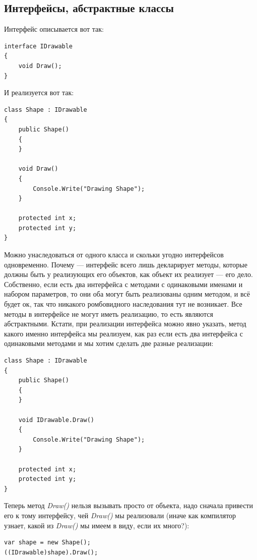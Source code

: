 \documentclass[a5paper]{article}
\begin{document}
\subsection{Интерфейсы, абстрактные классы}

Интерфейс описывается вот так:

\begin{verbatim}
interface IDrawable
{
    void Draw();
}
\end{verbatim}

И реализуется вот так:

\begin{verbatim}
class Shape : IDrawable
{
    public Shape() 
    { 
    }

    void Draw()
    {
        Console.Write("Drawing Shape");
    }

    protected int x;
    protected int y;
}
\end{verbatim}

Можно унаследоваться от одного класса и скольки угодно интерфейсов одновременно. Почему --- интерфейс всего лишь декларирует методы, которые должны быть у реализующих его объектов, как объект их реализует --- его дело. Собственно, если есть два интерфейса с методами с одинаковыми именами и набором параметров, то они оба могут быть реализованы одним методом, и всё будет ок, так что никакого ромбовидного наследования тут не возникает. Все методы в интерфейсе не могут иметь реализацию, то есть являются абстрактными. Кстати, при реализации интерфейса можно явно указать, метод какого именно интерфейса мы реализуем, как раз если есть два интерфейса с одинаковыми методами и мы хотим сделать две разные реализации:

\begin{verbatim}
class Shape : IDrawable
{
    public Shape() 
    { 
    }

    void IDrawable.Draw()
    {
        Console.Write("Drawing Shape");
    }

    protected int x;
    protected int y;
}
\end{verbatim}

Теперь метод \textit{Draw()} нельзя вызывать просто от объекта, надо сначала привести его к тому интерфейсу, чей \textit{Draw()} мы реализовали (иначе как компилятор узнает, какой из \textit{Draw()} мы имеем в виду, если их много?):

\begin{verbatim}
var shape = new Shape();
((IDrawable)shape).Draw();
\end{verbatim}
\end{document}
